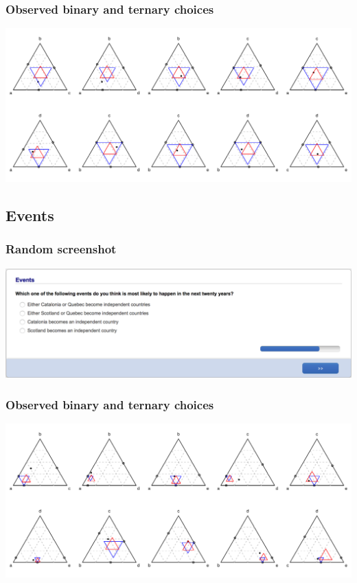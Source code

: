 \documentclass[11pt,letter]{article}
\begin{document}
\subsubsection*{Observed binary and ternary choices}

\includegraphics[width=15cm]{./Population_study_data/Simplexes/colour_pairs.pdf}

\pagebreak

\subsection*{Events}



\subsubsection*{Random screenshot}

\includegraphics[width=15cm]{Population_study_design/screenshot_events.png}

\subsubsection*{Observed binary and ternary choices}

\includegraphics[width=15cm]{./Population_study_data/Simplexes/events.pdf}
\end{document}
